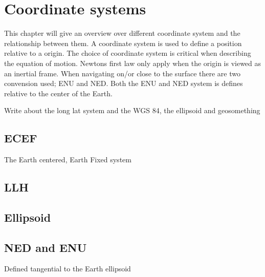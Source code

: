 
\chapter{Coordinate systems}
This chapter will give an overview over different coordinate system and the relationship between them. A coordinate system is used to define a position relative to a origin. The choice of coordinate system is critical when describing the equation of motion. Newtons first law only apply when the origin is viewed as an inertial frame. When navigating on/or close to the surface there are two convension used; ENU and NED. Both the ENU and NED system is defines relative to the center of the Earth.

Write about the long lat system and the WGS 84, the ellipsoid and geosomething
\section{ECEF}
The Earth centered, Earth Fixed system

\section{LLH}
\section{Ellipsoid}

\section{NED and ENU}
Defined tangential to the Earth ellipsoid

\cleardoublepage